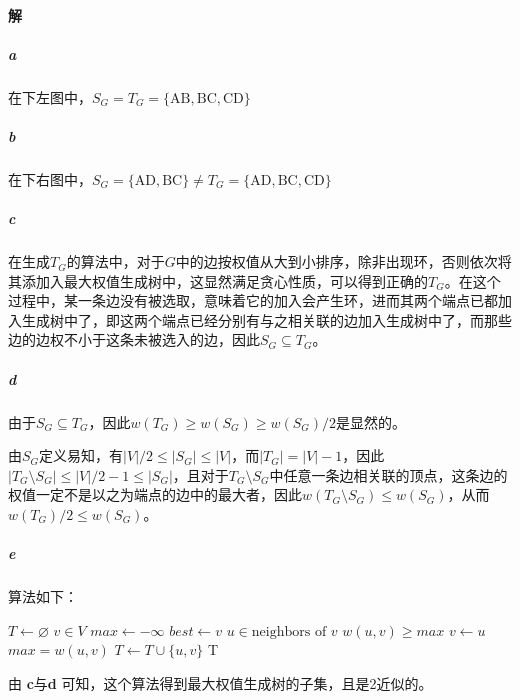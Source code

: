 \documentclass{article}
\begin{document}
\paragraph{解}
\subparagraph{a}
在下左图中，$S_G = T_G = \{\text{AB}, \text{BC}, \text{CD}\}$
\begin{figure}[htb]
    \centering
\end{figure}
\subparagraph{b}
在下右图中，$S_G = \{\text{AD}, \text{BC}\} \neq T_G = \{\text{AD}, \text{BC}, \text{CD}\}$
\subparagraph{c}
在生成$T_G$的算法中，对于$G$中的边按权值从大到小排序，除非出现环，否则依次将其添加入最大权值生成树中，这显然满足贪心性质，可以得到正确的$T_G$。在这个过程中，某一条边没有被选取，意味着它的加入会产生环，进而其两个端点已都加入生成树中了，即这两个端点已经分别有与之相关联的边加入生成树中了，而那些边的边权不小于这条未被选入的边，因此$S_G \subseteq T_G$。
\subparagraph{d}
由于$S_G \subseteq T_G$，因此$w(T_G) \geq w(S_G) \geq w(S_G) / 2$是显然的。\par
由$S_G$定义易知，有$|V| / 2 \leq |S_G| \leq |V|$，而$|T_G| = |V| - 1$，因此$|T_G \setminus S_G| \leq |V| / 2 - 1 \leq |S_G|$，且对于$T_G \setminus S_G$中任意一条边相关联的顶点，这条边的权值一定不是以之为端点的边中的最大者，因此$w(T_G \setminus S_G) \leq w(S_G)$，从而 $w(T_G) / 2 \leq w(S_G) $。
\subparagraph{e} 算法如下：
\begin{codebox}
    \li $T \gets \varnothing$
    \li \For $v \in V$
        \Do
    \li     $max \gets -\infty$
    \li     $best \gets v$
    \li     \For $u \in \text{neighbors of } v$
            \Do
    \li         \If $w(u, v) \geq max$
                \Then
    \li             $v \gets u$
    \li             $max = w(u, v)$
                \End
            \End
    \li     $T \gets T \cup \{u, v\}$
        \End
    \li \Return T
\end{codebox}
由 \textbf{c}与\textbf{d} 可知，这个算法得到最大权值生成树的子集，且是2近似的。
\end{document}
